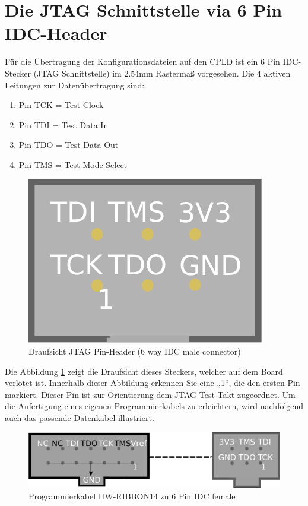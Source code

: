 \documentclass{article}
\begin{document}
\section{Die JTAG Schnittstelle via 6 Pin IDC-Header}

Für die Übertragung der Konfigurationsdateien auf den CPLD ist ein 6 Pin IDC-Stecker (JTAG Schnittstelle) im 2.54mm Rastermaß vorgesehen. Die 4 aktiven Leitungen zur Datenübertragung sind:

\begin{enumerate}
	\item Pin TCK = Test Clock
	\item Pin TDI = Test Data In
	\item Pin TDO = Test Data Out
	\item Pin TMS = Test Mode Select
\end{enumerate}

\begin{figure}[!h]
	\centering
	\includegraphics[width=0.25\linewidth]{Figures/PinHeader6P_male}
	\caption{Draufsicht JTAG Pin-Header (6 way IDC male connector)}
	\label{fig:pinheader}
\end{figure}

\newpage

Die Abbildung \ref{fig:pinheader} zeigt die Draufsicht dieses Steckers, welcher auf dem Board verlötet ist.
Innerhalb dieser Abbildung erkennen Sie eine „1“, die den ersten Pin markiert. Dieser Pin ist zur Orientierung dem JTAG Test-Takt zugeordnet. Um die Anfertigung eines eigenen Programmierkabels zu erleichtern, wird nachfolgend auch das passende Datenkabel illustriert.

\begin{figure}[!h]
	\centering
	\includegraphics[width=0.9\linewidth]{Figures/data_cable}
	\caption{Programmierkabel HW-RIBBON14 zu 6 Pin IDC female}
	\label{fig:data_cable}
\end{figure}
\end{document}
